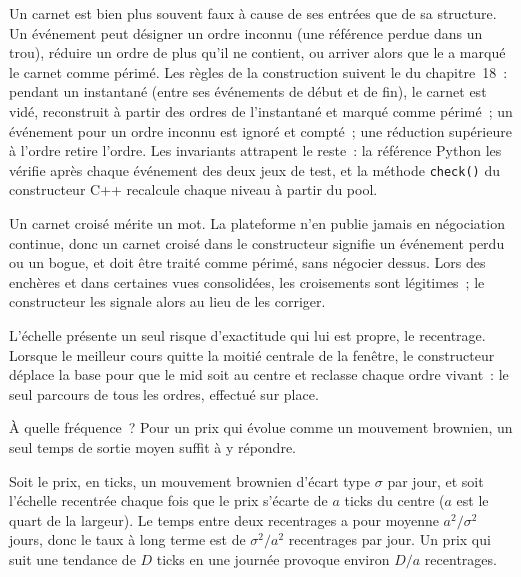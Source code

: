Un carnet est bien plus souvent faux à cause de ses entrées que de sa structure. Un événement peut désigner un ordre inconnu (une
référence perdue dans un trou), réduire un ordre de plus qu'il ne contient, ou arriver alors que le  a marqué le carnet comme périmé.
Les règles de la construction suivent le  du chapitre~18~: pendant un instantané (entre ses événements de début et de fin), le carnet est
vidé, reconstruit à partir des ordres de l'instantané et marqué comme périmé~; un événement pour un ordre inconnu est ignoré et compté~; une
réduction supérieure à l'ordre retire l'ordre. Les invariants attrapent le reste~: la référence Python les vérifie après chaque
événement des deux jeux de test, et la méthode \texttt{check()} du constructeur C++ recalcule chaque niveau à partir du pool.

Un carnet croisé mérite un mot. La plateforme n'en publie jamais en négociation continue, donc un carnet croisé dans le constructeur signifie
un événement perdu ou un bogue, et doit être traité comme périmé, sans négocier dessus. Lors des enchères et dans certaines vues consolidées, les croisements sont
légitimes~; le constructeur les signale alors au lieu de les corriger.

L'échelle présente un seul risque d'exactitude qui lui est propre, le recentrage. Lorsque le meilleur cours quitte la moitié centrale de la fenêtre, le constructeur
déplace la base pour que le mid soit au centre et reclasse chaque ordre vivant~: le seul parcours de tous les ordres, effectué
sur place.

\label{lst:ll:the-order-book-builder:recentre}

À quelle fréquence~? Pour un prix qui évolue comme un mouvement brownien, un seul temps de sortie moyen suffit à y répondre.

\begin{proposition}\label{prop:ll:the-order-book-builder:recentre}
Soit le prix, en ticks, un mouvement brownien d'écart type $\sigma$ par jour, et soit l'échelle recentrée
chaque fois que le prix s'écarte de $a$ ticks du centre ($a$ est le quart de la largeur). Le temps entre deux recentrages a pour moyenne
$a^2/\sigma^2$ jours, donc le taux à long terme est de $\sigma^2/a^2$ recentrages par jour. Un prix qui suit une tendance de $D$ ticks en une journée provoque
environ $D/a$ recentrages.
\end{proposition}


